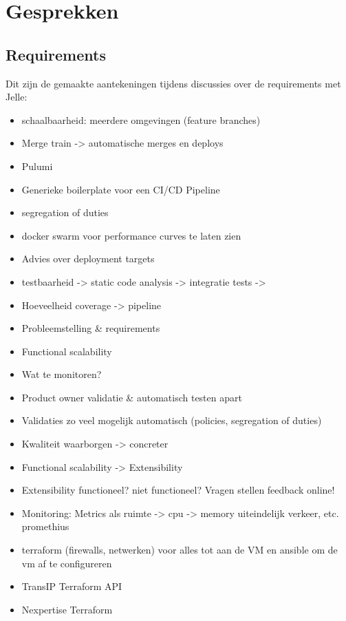 
\chapter{Gesprekken} %

\label{Feedback} 

\section{Requirements}

\label{FeedbackRequirements}

Dit zijn de gemaakte aantekeningen tijdens discussies over de requirements met Jelle:
\begin{itemize}
	\item schaalbaarheid: meerdere omgevingen (feature branches)
	\item Merge train -> automatische merges en deploys
	\item Pulumi
	\item Generieke boilerplate voor een CI/CD Pipeline
	\item segregation of duties
	\item docker swarm voor performance curves te laten zien
	\item Advies over deployment targets
	\item testbaarheid -> static code analysis -> integratie tests ->
	\item Hoeveelheid coverage -> pipeline 
	\item Probleemstelling \& requirements
	\item Functional scalability
	\item Wat te monitoren?
	\item Product owner validatie \& automatisch testen apart
	\item Validaties zo veel mogelijk automatisch (policies, segregation of duties)
	\item Kwaliteit waarborgen -> concreter
	\item Functional scalability -> Extensibility
	\item Extensibility functioneel? niet functioneel? Vragen stellen feedback online!
	\item Monitoring: Metrics als ruimte -> cpu -> memory uiteindelijk verkeer, etc. promethius
	\item terraform (firewalls, netwerken) voor alles tot aan de VM en ansible om de vm af te configureren
	\item TransIP Terraform API
	\item Nexpertise Terraform
\end{itemize}

